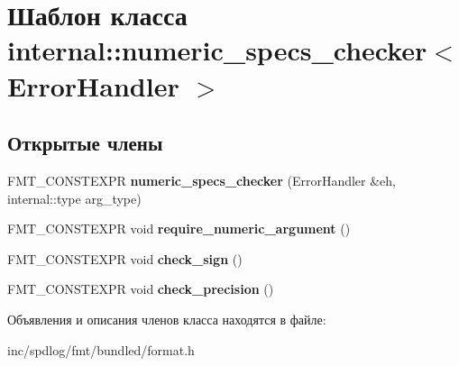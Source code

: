 \hypertarget{classinternal_1_1numeric__specs__checker}{}\section{Шаблон класса internal\+:\+:numeric\+\_\+specs\+\_\+checker$<$ Error\+Handler $>$}
\label{classinternal_1_1numeric__specs__checker}
\subsection*{Открытые члены}
\begin{DoxyCompactItemize}
\item 
\mbox{\label{classinternal_1_1numeric__specs__checker_a9c945fe4fa81aa7435aa27270b2cac3f}} 
F\+M\+T\+\_\+\+C\+O\+N\+S\+T\+E\+X\+PR {\bfseries numeric\+\_\+specs\+\_\+checker} (Error\+Handler \&eh, internal\+::type arg\+\_\+type)
\item 
\mbox{\label{classinternal_1_1numeric__specs__checker_af3e590f8c430d56d92a5dde002319e83}} 
F\+M\+T\+\_\+\+C\+O\+N\+S\+T\+E\+X\+PR void {\bfseries require\+\_\+numeric\+\_\+argument} ()
\item 
\mbox{\label{classinternal_1_1numeric__specs__checker_ab81009b29b5041278867612d1413e0a4}} 
F\+M\+T\+\_\+\+C\+O\+N\+S\+T\+E\+X\+PR void {\bfseries check\+\_\+sign} ()
\item 
\mbox{\label{classinternal_1_1numeric__specs__checker_a0936ea839df192e592603dd773050c04}} 
F\+M\+T\+\_\+\+C\+O\+N\+S\+T\+E\+X\+PR void {\bfseries check\+\_\+precision} ()
\end{DoxyCompactItemize}


Объявления и описания членов класса находятся в файле\+:\begin{DoxyCompactItemize}
\item 
inc/spdlog/fmt/bundled/format.\+h\end{DoxyCompactItemize}
